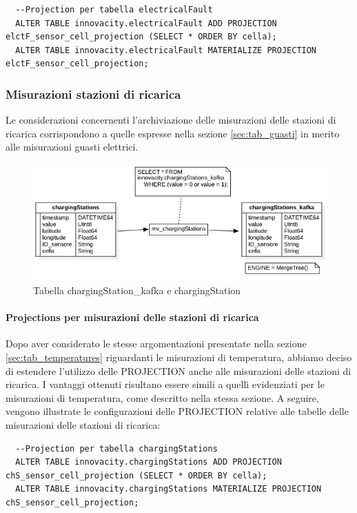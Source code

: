 \begin{lstlisting}
  --Projection per tabella electricalFault
  ALTER TABLE innovacity.electricalFault ADD PROJECTION elctF_sensor_cell_projection (SELECT * ORDER BY cella);
  ALTER TABLE innovacity.electricalFault MATERIALIZE PROJECTION elctF_sensor_cell_projection;
\end{lstlisting}

\subsubsection{Misurazioni stazioni di ricarica} Le considerazioni concernenti l'archiviazione delle misurazioni delle stazioni di ricarica corrispondono a quelle espresse nella sezione \ref{sec:tab_guasti} in merito alle misurazioni guasti elettrici.

\begin{figure}[H]
    \centering
    \includegraphics[width=1\textwidth]{../Images/SpecificaTecnica/chargingStations.png}
    \caption{Tabella chargingStation\_kafka e chargingStation}
    \label{fig:chargingStation_tables}
  \end{figure}

\paragraph{Projections per misurazioni delle stazioni di ricarica}
Dopo aver considerato le stesse argomentazioni presentate nella sezione \ref{sec:tab_temperatures} riguardanti le misurazioni di temperatura, abbiamo deciso di estendere l'utilizzo delle PROJECTION anche alle misurazioni delle stazioni di ricarica. I vantaggi ottenuti risultano essere simili a quelli evidenziati per le misurazioni di temperatura, come descritto nella stessa sezione. A seguire, vengono illustrate le configurazioni delle PROJECTION relative alle tabelle delle misurazioni delle stazioni di ricarica:

\begin{lstlisting}
  --Projection per tabella chargingStations
  ALTER TABLE innovacity.chargingStations ADD PROJECTION chS_sensor_cell_projection (SELECT * ORDER BY cella);
  ALTER TABLE innovacity.chargingStations MATERIALIZE PROJECTION chS_sensor_cell_projection;
\end{lstlisting}

